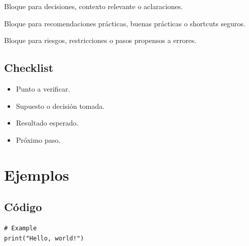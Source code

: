 \begin{noteBox}
Bloque para decisiones, contexto relevante o aclaraciones.
\end{noteBox}

\vspace{2mm}

\begin{tipBox}
Bloque para recomendaciones prácticas, buenas prácticas o shortcuts seguros.
\end{tipBox}

\vspace{2mm}

\begin{warnBox}
Bloque para riesgos, restricciones o pasos propensos a errores.
\end{warnBox}

\vspace{2mm}


\subsection{Checklist}
\vspace{2mm}

\begin{itemize}
  \item Punto a verificar.
  \item Supuesto o decisión tomada.
  \item Resultado esperado.
  \item Próximo paso.
\end{itemize}

\vspace{2mm}


\section{Ejemplos}
\vspace{2mm}

\subsection{Código}
\vspace{2mm}

\begin{lstlisting}
# Example
print("Hello, world!")
\end{lstlisting}

\vspace{2mm}


